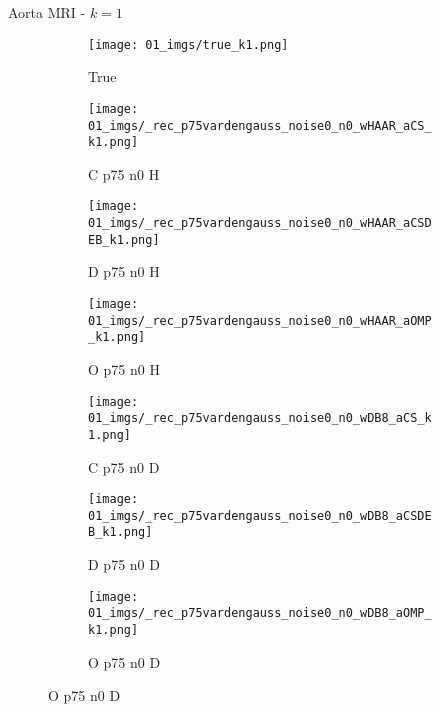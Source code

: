 \begin{frame}{Aorta MRI - $k=1$}{}
\begin{figure}
\begin{subfigure}{0.13\textwidth}
\texttt{[image: 01\_imgs/true\_k1.png]}
\caption*{\tiny True}
\end{subfigure}
\begin{subfigure}{0.13\textwidth}
\texttt{[image: 01\_imgs/\_rec\_p75vardengauss\_noise0\_n0\_wHAAR\_aCS\_k1.png]}
\caption*{\tiny C p75 n0 H}
\end{subfigure}
\begin{subfigure}{0.13\textwidth}
\texttt{[image: 01\_imgs/\_rec\_p75vardengauss\_noise0\_n0\_wHAAR\_aCSDEB\_k1.png]}
\caption*{\tiny D p75 n0 H}
\end{subfigure}
\begin{subfigure}{0.13\textwidth}
\texttt{[image: 01\_imgs/\_rec\_p75vardengauss\_noise0\_n0\_wHAAR\_aOMP\_k1.png]}
\caption*{\tiny O p75 n0 H}
\end{subfigure}
\begin{subfigure}{0.13\textwidth}
\texttt{[image: 01\_imgs/\_rec\_p75vardengauss\_noise0\_n0\_wDB8\_aCS\_k1.png]}
\caption*{\tiny C p75 n0 D}
\end{subfigure}
\begin{subfigure}{0.13\textwidth}
\texttt{[image: 01\_imgs/\_rec\_p75vardengauss\_noise0\_n0\_wDB8\_aCSDEB\_k1.png]}
\caption*{\tiny D p75 n0 D}
\end{subfigure}
\begin{subfigure}{0.13\textwidth}
\texttt{[image: 01\_imgs/\_rec\_p75vardengauss\_noise0\_n0\_wDB8\_aOMP\_k1.png]}
\caption*{\tiny O p75 n0 D}
\end{subfigure}
\end{figure}
\end{frame}


